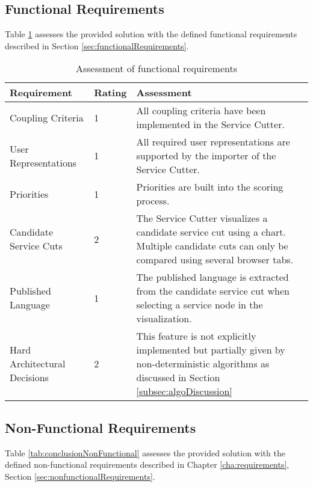 \subsection{Functional Requirements}

Table \ref{tab:conclusionFunctional} assesses the provided solution with the defined functional requirements described in Section \ref{sec:functionalRequirements}.

\begin{table}[H]
	\centering
	\caption{Assessment of functional requirements}
	\label{tab:conclusionFunctional}
	\begin{tabular}{|p{100pt}|l|p{250pt}|}
	\hline \textbf{Requirement} & \textbf{Rating} & \textbf{Assessment} \\ 
	\hline Coupling Criteria & 1 & All coupling criteria have been implemented in the Service Cutter.  \\ %
	\hline User Representations & 1 & All required user representations are supported by the importer of the Service Cutter. \\ 
	\hline Priorities & 1 & Priorities are built into the scoring process. \\ 
	\hline Candidate Service Cuts & 2 & The Service Cutter visualizes a candidate service cut using a chart. Multiple candidate cuts can only be compared using several browser tabs. \\ 
	\hline Published Language & 1 & The published language is extracted from the candidate service cut when selecting a service node in the visualization.  \\ 
	\hline Hard Architectural Decisions & 2 & This feature is not explicitly implemented but partially given by non-deterministic algorithms as discussed in Section \ref{subsec:algoDiscussion}\\
	\hline 
	\end{tabular} 
\end{table}

\subsection{Non-Functional Requirements}

Table \ref{tab:conclusionNonFunctional} assesses the provided solution with the defined non-functional requirements described in Chapter \ref{cha:requirements}, Section \ref{sec:nonfunctionalRequirements}.

